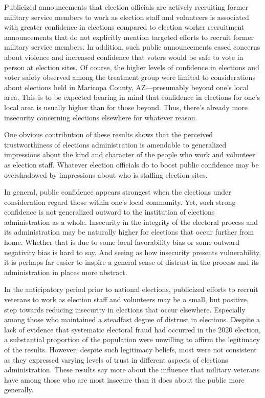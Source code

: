 \documentclass[
  12pt,
  letterpaper,
]{article}
\begin{document}
Publicized announcements that election officials are actively recruiting
former military service members to work as election staff and volunteers
is associated with greater confidence in elections compared to election
worker recruitment announcements that do not explicitly mention targeted
efforts to recruit former military service members. In addition, such
public announcements eased concerns about violence and increased
confidence that voters would be safe to vote in person at election
sites. Of course, the higher levels of confidence in elections and voter
safety observed among the treatment group were limited to considerations
about elections held in Maricopa County, AZ---presumably beyond one's
local area. This is to be expected bearing in mind that confidence in
elections for one's local area is usually higher than for those beyond.
Thus, there's already more insecurity concerning elections elsewhere for
whatever reason.

One obvious contribution of these results shows that the perceived
trustworthiness of elections administration is amendable to generalized
impressions about the kind and character of the people who work and
volunteer as election staff. Whatever election officials do to boost
public confidence may be overshadowed by impressions about who is
staffing election sites.

In general, public confidence appears strongest when the elections under
consideration regard those within one's local community. Yet, such
strong confidence is not generalized outward to the institution of
elections administration as a whole. Insecurity in the integrity of the
electoral process and its administration may be naturally higher for
elections that occur further from home. Whether that is due to some
local favorability bias or some outward negativity bias is hard to say.
And seeing as how insecurity presents vulnerability, it is perhaps far
easier to inspire a general sense of distrust in the process and its
administration in places more abstract.

In the anticipatory period prior to national elections, publicized
efforts to recruit veterans to work as election staff and volunteers may
be a small, but positive, step towards reducing insecurity in elections
that occur elsewhere. Especially among those who maintained a steadfast
degree of distrust in elections. Despite a lack of evidence that
systematic electoral fraud had occurred in the 2020 election, a
substantial proportion of the population were unwilling to affirm the
legitimacy of the results. However, despite such legitimacy beliefs,
most were not consistent as they expressed varying levels of trust in
different aspects of elections administration. These results say more
about the influence that military veterans have among those who are most
insecure than it does about the public more generally.
\end{document}
